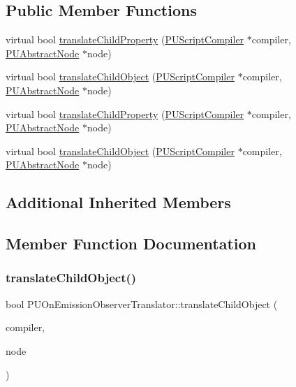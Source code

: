 \subsection*{Public Member Functions}
\begin{DoxyCompactItemize}
\item 
virtual bool \hyperlink{classPUOnEmissionObserverTranslator_a9bec17fbbb8efe92be3b23e02c7ce6a9}{translate\+Child\+Property} (\hyperlink{classPUScriptCompiler}{P\+U\+Script\+Compiler} $\ast$compiler, \hyperlink{classPUAbstractNode}{P\+U\+Abstract\+Node} $\ast$node)
\item 
virtual bool \hyperlink{classPUOnEmissionObserverTranslator_a084469572299af5f7879ce6ab633858e}{translate\+Child\+Object} (\hyperlink{classPUScriptCompiler}{P\+U\+Script\+Compiler} $\ast$compiler, \hyperlink{classPUAbstractNode}{P\+U\+Abstract\+Node} $\ast$node)
\item 
virtual bool \hyperlink{classPUOnEmissionObserverTranslator_a377b494403c0ba66843166c448e30970}{translate\+Child\+Property} (\hyperlink{classPUScriptCompiler}{P\+U\+Script\+Compiler} $\ast$compiler, \hyperlink{classPUAbstractNode}{P\+U\+Abstract\+Node} $\ast$node)
\item 
virtual bool \hyperlink{classPUOnEmissionObserverTranslator_ab81e1cae6233df0ba1c4227edbdf59d2}{translate\+Child\+Object} (\hyperlink{classPUScriptCompiler}{P\+U\+Script\+Compiler} $\ast$compiler, \hyperlink{classPUAbstractNode}{P\+U\+Abstract\+Node} $\ast$node)
\end{DoxyCompactItemize}
\subsection*{Additional Inherited Members}


\subsection{Member Function Documentation}
\mbox{\label{classPUOnEmissionObserverTranslator_a084469572299af5f7879ce6ab633858e}} 
\subsubsection{\texorpdfstring{translate\+Child\+Object()}{translateChildObject()}\hspace{0.1cm}{\footnotesize\ttfamily [1/2]}}
{\footnotesize\ttfamily bool P\+U\+On\+Emission\+Observer\+Translator\+::translate\+Child\+Object (\begin{DoxyParamCaption}\item[{\hyperlink{classPUScriptCompiler}{P\+U\+Script\+Compiler} $\ast$}]{compiler,  }\item[{\hyperlink{classPUAbstractNode}{P\+U\+Abstract\+Node} $\ast$}]{node }\end{DoxyParamCaption})\hspace{0.3cm}{\ttfamily [virtual]}}

